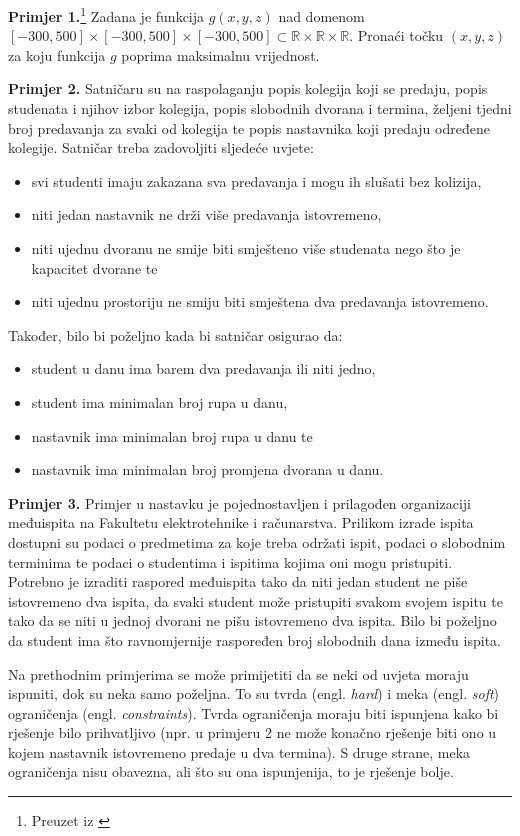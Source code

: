 \documentclass[times, utf8, zavrsni]{fer}
\begin{document}
\textbf{Primjer 1.}\footnote{Preuzet iz \citep{cupic2013prirodom}}
Zadana je funkcija $g(x, y, z)$ nad domenom $[-300, 500] \times [-300, 500] \times [-300, 500] \subset
\mathbb{R} \times \mathbb{R} \times \mathbb{R}$. Pronaći točku $(x, y, z)$ za koju funkcija $g$ poprima maksimalnu vrijednost.

\textbf{Primjer 2.} Satničaru su na raspolaganju popis kolegija koji se predaju, popis studenata i njihov izbor kolegija, popis slobodnih dvorana i termina,
željeni tjedni broj predavanja za svaki od kolegija te popis nastavnika koji predaju određene kolegije. Satničar treba zadovoljiti
sljedeće uvjete:
\begin{itemize}
  \item svi studenti imaju zakazana sva predavanja i mogu ih slušati bez kolizija,
  \item niti jedan nastavnik ne drži više predavanja istovremeno,
  \item niti ujednu dvoranu ne smije biti smješteno više studenata nego što je kapacitet dvorane te
  \item niti ujednu prostoriju ne smiju biti smještena dva predavanja istovremeno.
\end{itemize}
Također, bilo bi poželjno kada bi satničar osigurao da:
\begin{itemize}
  \item student u danu ima barem dva predavanja ili niti jedno,
  \item student ima minimalan broj rupa u danu,
  \item nastavnik ima minimalan broj rupa u danu te
  \item nastavnik ima minimalan broj promjena dvorana u danu.
\end{itemize}

\textbf{Primjer 3.}
Primjer u nastavku je pojednostavljen i prilagođen organizaciji međuispita na Fakultetu elektrotehnike i računarstva.
Prilikom izrade ispita dostupni su podaci o predmetima za koje treba održati ispit, podaci o slobodnim terminima te
podaci o studentima i ispitima kojima oni mogu pristupiti. Potrebno je izraditi raspored međuispita tako da niti jedan
student ne piše istovremeno dva ispita, da svaki student može pristupiti svakom svojem ispitu
te tako da se niti u jednoj dvorani ne pišu istovremeno dva ispita. Bilo bi poželjno
da student ima što ravnomjernije raspoređen broj slobodnih dana između ispita.

Na prethodnim primjerima se može primijetiti da se neki od uvjeta moraju ispuniti, dok su neka samo poželjna. To su tvrda
(engl. \textit{hard}) i meka (engl. \textit{soft}) ograničenja (engl. \textit{constraints}). Tvrda ograničenja moraju biti ispunjena kako bi rješenje bilo prihvatljivo (npr. u primjeru 2 ne može konačno rješenje biti ono u kojem nastavnik istovremeno predaje u dva termina). S druge strane, meka ograničenja nisu obavezna, ali što su ona ispunjenija, to je rješenje bolje.
\end{document}
